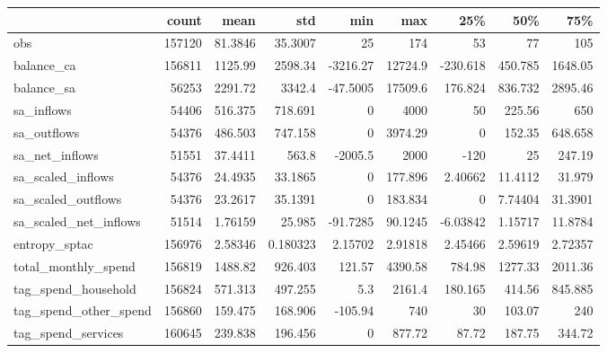 \begin{tabular}{lrrrrrrrr}
\toprule
                         &   count &       mean &         std &         min &         max &        25\% &        50\% &        75\% \\
\midrule
 obs                     &  157120 &   81.3846  &   35.3007   &    25       &   174       &   53       &   77       &  105       \\
 balance\_ca              &  156811 & 1125.99    & 2598.34     & -3216.27    & 12724.9     & -230.618   &  450.785   & 1648.05    \\
 balance\_sa              &   56253 & 2291.72    & 3342.4      &   -47.5005  & 17509.6     &  176.824   &  836.732   & 2895.46    \\
 sa\_inflows              &   54406 &  516.375   &  718.691    &     0       &  4000       &   50       &  225.56    &  650       \\
 sa\_outflows             &   54376 &  486.503   &  747.158    &     0       &  3974.29    &    0       &  152.35    &  648.658   \\
 sa\_net\_inflows          &   51551 &   37.4411  &  563.8      & -2005.5     &  2000       & -120       &   25       &  247.19    \\
 sa\_scaled\_inflows       &   54376 &   24.4935  &   33.1865   &     0       &   177.896   &    2.40662 &   11.4112  &   31.979   \\
 sa\_scaled\_outflows      &   54376 &   23.2617  &   35.1391   &     0       &   183.834   &    0       &    7.74404 &   31.3901  \\
 sa\_scaled\_net\_inflows   &   51514 &    1.76159 &   25.985    &   -91.7285  &    90.1245  &   -6.03842 &    1.15717 &   11.8784  \\
 entropy\_sptac           &  156976 &    2.58346 &    0.180323 &     2.15702 &     2.91818 &    2.45466 &    2.59619 &    2.72357 \\
 total\_monthly\_spend     &  156819 & 1488.82    &  926.403    &   121.57    &  4390.58    &  784.98    & 1277.33    & 2011.36    \\
 tag\_spend\_household     &  156824 &  571.313   &  497.255    &     5.3     &  2161.4     &  180.165   &  414.56    &  845.885   \\
 tag\_spend\_other\_spend   &  156860 &  159.475   &  168.906    &  -105.94    &   740       &   30       &  103.07    &  240       \\
 tag\_spend\_services      &  160645 &  239.838   &  196.456    &     0       &   877.72    &   87.72    &  187.75    &  344.72    \\

\end{tabular}
